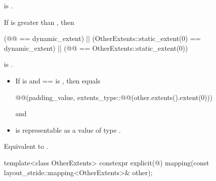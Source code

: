 \begin{itemdescr}
\pnum
\constraints
{} is .

\pnum
\mandates
If  is greater than , then
\begin{codeblock}
(@@ == dynamic_extent) ||
(OtherExtents::static_extent(0) == dynamic_extent) ||
(@@ == OtherExtents::static_extent(0))
\end{codeblock}
is .

\pnum
\expects
\begin{itemize}
\item
If  is  and
 ==  is ,
then  equals
\begin{codeblock}
@@(padding_value,
                        extents_type::@@(other.extents().extent(0)))
\end{codeblock}
and
\item
{} is representable as
a value of type .
\end{itemize}

\pnum
\effects
Equivalent to .
\end{itemdescr}

%
\begin{itemdecl}
template<class OtherExtents>
  constexpr explicit(@\seebelow@)
    mapping(const layout_stride::mapping<OtherExtents>& other);
\end{itemdecl}

